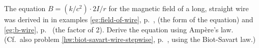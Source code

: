 The equation $B=(k/c^2)\cdot 2I/r$ for the magnetic field of a long, straight wire was derived in
in examples \ref{eg:field-of-wire}, p.~\pageref{eg:field-of-wire}, (the form of the equation) and
\ref{eg:b-wire}, p.~\pageref{eg:b-wire} (the factor of 2).
Derive the equation using Amp\`{e}re's law. (Cf.~also problem \ref{hw:biot-savart-wire-stepwise},
p.~\pageref{hw:biot-savart-wire-stepwise}, using the Biot-Savart law.)
